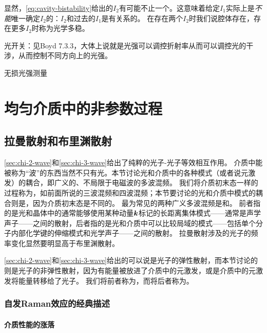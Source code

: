 显然，\eqref{eq:cavity-bistability}给出的$I_2$有可能不止一个。这意味着给定$I_1$实际上是\emph{不能}唯一确定$I_2$的：$I_2$和过去的$I_1$是有关系的。
在存在两个$I_2$时我们说腔体存在，存在更多$I_2$时称为光学多稳。

光开关：见Boyd 7.3.3，大体上说就是光强可以调控折射率从而可以调控光的干涉，从而控制不同方向上的光强。

无损光强测量

\chapter{均匀介质中的非参数过程}

\section{拉曼散射和布里渊散射}\label{sec:general-four-wave}

\autoref{sec:chi-2-wave}和\autoref{sec:chi-3-wave}给出了纯粹的光子-光子等效相互作用。
介质中能被称为“波”的东西当然不只有光。本节讨论光和介质中的各种模式（或者说元激发）的耦合，即广义的、不局限于电磁波的多波混频。
我们将介质初末态一样的过程称为，如前面所说的三波混频和四波混频；本节要讨论的光和介质中模式的耦合则是，因为介质初末态是不同的。
最为常见的两种广义多波混频是和。
前者指的是光和晶体中的通常能够使用某种动量$\vb*{k}$标记的长距离集体模式——通常是声学声子——之间的散射，后者指的是光和介质中可以比较局域的模式——包括单个分子内部化学键的伸缩模式和光学声子——之间的散射。
拉曼散射涉及的光子的频率变化显然要明显高于布里渊散射。

\autoref{sec:chi-2-wave}和\autoref{sec:chi-3-wave}给出的可以说是光子的弹性散射，而本节讨论的则是光子的非弹性散射，因为有能量被放进了介质中的元激发，或是介质中的元激发将能量转移给了光子。
我们将前者称为，而将后者称为。

\subsection{自发Raman效应的经典描述}

\subsubsection{介质性能的涨落}

